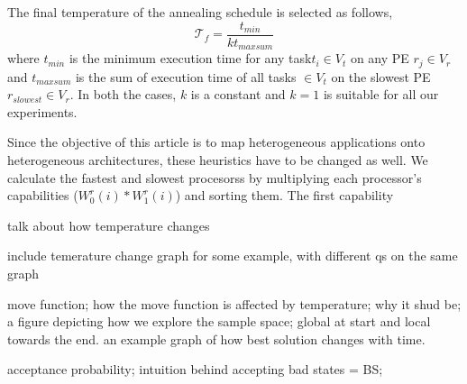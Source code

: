 The final temperature of the annealing schedule is selected as follows,
\begin{equation}
\mathcal{T}_f = \frac{t_{min}}{kt_{maxsum}}
\end{equation}
where $t_{min}$ is the minimum execution time for any task$t_i \in V_t$ on any
PE $r_j \in V_r$ and $t_{maxsum}$ is the sum of execution time of all tasks $\in
V_t$ on the slowest PE $r_{slowest} \in V_r$. In both the cases, $k$ is a
constant and $k=1$ is suitable for all our experiments.

Since the objective of this article is to map heterogeneous applications onto
heterogeneous architectures, these heuristics have to be changed as well. We
calculate the fastest and slowest procesorss by multiplying each processor's
capabilities ($W^r_0(i) * W^r_1(i)$) and sorting them. The first capability 

talk about how temperature changes

include temerature change graph for some example, with different qs on the same
graph

move function; how the move function is affected by temperature; why it shud be;
a figure depicting how we explore the sample space; global at start and local
towards the end.
an example graph of how best solution changes with time.

acceptance probability; intuition behind accepting bad states = BS;



